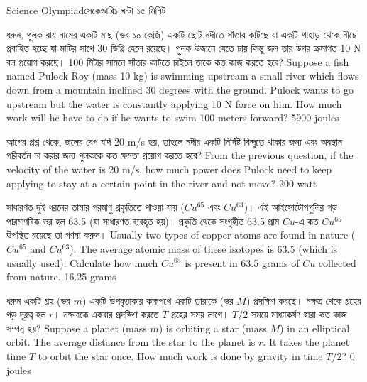 \documentclass[article, 12pt, a4paper, onesize]{memoir}
\begin{document}
 {Science Olympiad}{সেকেন্ডারি}{১ ঘন্টা ১৫ মিনিট}

\begin{Problems}

    \problem
    {ধরুন, পুলক রায় নামের একটি মাছ (ভর ১০ কেজি) একটি ছোট নদীতে সাঁতার কাটছে যা একটি পাহাড় থেকে নীচে প্রবাহিত হচ্ছে যা মাটির সাথে 30 ডিগ্রি হেলে রয়েছে। পুলক উজানে যেতে চায় কিন্তু জল তার উপর ক্রমাগত 10 N বল প্রয়োগ করছে। 100 মিটার সামনে সাঁতার কাটতে চাইলে তাকে কত কাজ করতে হবে?}
    {Suppose a fish named Pulock Roy (mass 10 kg) is swimming upstream a small river which flows down from a mountain inclined 30 degrees with the ground. Pulock wants to go upstream but the water is constantly applying 10 N force on him. How much work will he have to do if he wants to swim 100 meters forward?}
    {}
    {5900 joules}

    \problem
    {আগের প্রশ্ন থেকে, জলের বেগ যদি 20 m/s হয়, তাহলে নদীর একটি নির্দিষ্ট বিন্দুতে থাকার জন্য এবং অবস্থান পরিবর্তন না করার জন্য পুলককে কত ক্ষমতা প্রয়োগ করতে হবে?}
    {From the previous question, if the velocity of the water is 20 m/s, how much power does Pulock need to keep applying to stay at a certain point in the river and not move?}
    {}
    {200 watt}

    \problem
    {সাধারণত দুই ধরনের তামার পরমাণু প্রকৃতিতে পাওয়া যায় ($Cu^{65}$ এবং $Cu^{63}$)। এই আইসোটোপগুলির গড় পারমাণবিক ভর হল 63.5 (যা সাধারণত ব্যবহৃত হয়)। প্রকৃতি থেকে সংগৃহীত 63.5 গ্রাম $Cu$-এ কত $Cu^{65}$ উপস্থিত রয়েছে তা গণনা করুন।}
    {Usually two types of copper atoms are found in nature ($Cu^{65}$ and $Cu^{63}$). The average atomic mass of these isotopes is 63.5 (which is usually used). Calculate how much $Cu^{65}$ is present in 63.5 grams of $Cu$ collected from nature.}
    {}
    {16.25 grams}

    \problem
    {ধরুন একটি গ্রহ (ভর $m$) একটি উপবৃত্তাকার কক্ষপথে একটি তারাকে (ভর $M$) প্রদক্ষিণ করছে। নক্ষত্র থেকে গ্রহের গড় দূরত্ব হল $r$। নক্ষত্রকে একবার প্রদক্ষিণ করতে $T$ গ্রহের সময় লাগে। $T/2$ সময়ে মাধ্যাকর্ষণ দ্বারা কত কাজ সম্পন্ন হয়?}
    {Suppose a planet (mass $m$) is orbiting a star (mass $M$) in an elliptical orbit. The average distance from the star to the planet is $r$. It takes the planet time $T$ to orbit the star once. How much work is done by gravity in time $T/2$?}
    {}
    {0 joules}


\end{Problems}
\end{document}
